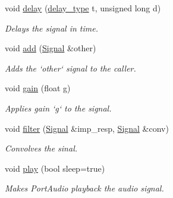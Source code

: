 \begin{DoxyCompactItemize}
void \hyperlink{classSignal_af3e3df149202f2d4ead2fa9fcd2310ab}{delay} (\hyperlink{classSignal_a45a2f1394f9d0be6fbaaf5160fa4817c}{delay\-\_\-type} t, unsigned long d)
\begin{DoxyCompactList}\small\item\em \-Delays the signal in time. \end{DoxyCompactList}\item 
void \hyperlink{classSignal_ab963fe5eed48884fcb658fefcd7ea5da}{add} (\hyperlink{classSignal}{\-Signal} \&other)
\begin{DoxyCompactList}\small\item\em \-Adds the `other` signal to the caller. \end{DoxyCompactList}\item 
void \hyperlink{classSignal_aa401154561534befea47331297689e74}{gain} (float g)
\begin{DoxyCompactList}\small\item\em \-Applies gain `g` to the signal. \end{DoxyCompactList}\item 
void \hyperlink{classSignal_a9a7011d55cd3eba679b78a3025953a25}{filter} (\hyperlink{classSignal}{\-Signal} \&imp\-\_\-resp, \hyperlink{classSignal}{\-Signal} \&conv)
\begin{DoxyCompactList}\small\item\em \-Convolves the sinal. \end{DoxyCompactList}\item 
void \hyperlink{classSignal_a5e8b9f3380ee51b93325391fedabbfe1}{play} (bool sleep=true)
\begin{DoxyCompactList}\small\item\em \-Makes \-Port\-Audio playback the audio signal. \end{DoxyCompactList}\end{DoxyCompactItemize}
